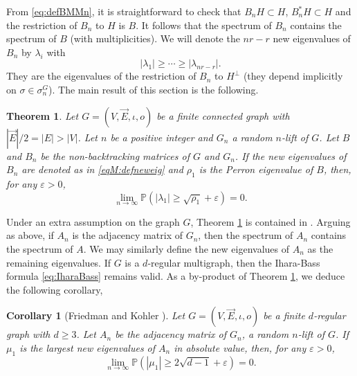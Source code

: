 \documentclass[11pt]{article}
\newtheorem{theorem}[lemma]{Theorem}
\newtheorem{corollary}[lemma]{Corollary}
\newcommand{\dP}{\mathbb{P}}
\newcommand{\PAR}[1]{{{\left(#1\right)}}} %
\newcommand{\1}{1\!\!{\sf I}}\newcommand{\IND}{\1}
\newcommand{\veps}{\varepsilon}
\begin{document}
From \eqref{eq:defBMMn}, it is straightforward to check that  $B_n H \subset H$,  $B_n^*  H \subset H$ and the restriction of $B_n$ to $H$ is $B$. It follows that the spectrum of $B_n$ contains the spectrum of $B$ (with multiplicities). We will denote the  $n r -r$ new eigenvalues of $B_n$ by $\lambda_i$ with
\begin{equation}\label{eqM:defneweig}
|\lambda_1| \geq \cdots \geq |\lambda_{nr -r}|. 
\end{equation}
They are the eigenvalues of the restriction of $B_n$ to $H^\perp$ (they depend implicitly on $\sigma \in \sigma^G_n$).  The main result of this section is the following. 

\begin{theorem}\label{thM:main}
Let $G = (V,\vec E,\iota,o)$ be a finite connected graph with $|\vec E|/2 = |E| > |V|$.  Let $n$ be a positive integer and  $G_n$ a random $n$-lift of $G$. Let $B$ and $B_n$ be the non-backtracking matrices of $G$ and $G_n$. If the new eigenvalues of $B_n$  are denoted as in \eqref{eqM:defneweig} and $\rho_1$ is the Perron eigenvalue of $B$,  then, for any $\veps > 0$,  
$$
\lim_{n \to \infty} \dP \PAR{ |\lambda_1|   \geq \sqrt{\rho_1}+ \veps} = 0.
$$ 
\end{theorem}

Under an extra assumption on the graph $G$, Theorem \ref{thM:main} is contained in \cite[Theorem 0.2.6]{FrKo}.
Arguing as above, if $A_n$ is the adjacency matrix of $G_n$, then the spectrum of $A_n$ contains the spectrum of $A$.  We may similarly define the new eigenvalues of $A_n$ as the remaining eigenvalues. If $G$ is a $d$-regular multigraph, then the Ihara-Bass formula \eqref{eq:IharaBass} remains valid. As a by-product of Theorem \ref{thM:main}, we deduce the following corollary, 
\begin{corollary}[Friedman and Kohler \cite{FrKo}]\label{corM:main}
Let $G = (V,\vec E,\iota,o)$ be a finite $d$-regular graph with $d \geq 3$. Let $A_n$ be the adjacency matrix of $G_n$, a random $n$-lift of $G$.  If $\mu_1$ is the largest  new eigenvalues of $A_n$ in absolute value, then, for any $\veps > 0$,  
$$
\lim_{n \to \infty} \dP \PAR{ |\mu_1|   \geq 2 \sqrt{d-1}+ \veps} = 0. 
$$
\end{corollary}
 
\end{document}
